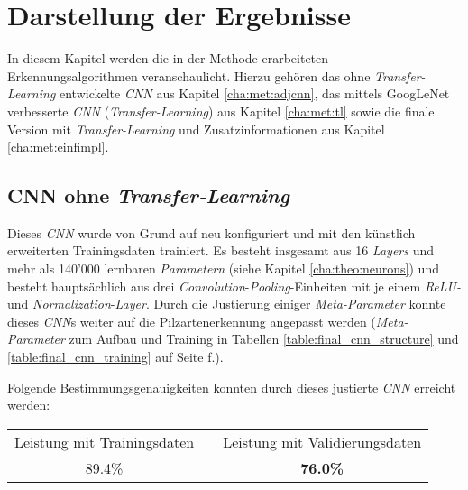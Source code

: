 \section{Darstellung der Ergebnisse}
In diesem Kapitel werden die in der Methode erarbeiteten Erkennungsalgorithmen veranschaulicht. Hierzu gehören das ohne \textit{Transfer-Learning} entwickelte \textit{CNN} aus Kapitel \ref{cha:met:adjcnn}, das mittels GoogLeNet verbesserte \textit{CNN} (\textit{Transfer-Learning}) aus Kapitel \ref{cha:met:tl} sowie die finale Version mit \textit{Transfer-Learning} und Zusatzinformationen aus Kapitel \ref{cha:met:einfimpl}.

\subsection{CNN ohne \textit{Transfer-Learning}}
Dieses \textit{CNN} wurde von Grund auf neu konfiguriert und mit den künstlich erweiterten Trainingsdaten trainiert. Es besteht insgesamt aus 16 \textit{Layers} und mehr als 140'000 lernbaren \textit{Parametern} (siehe Kapitel \ref{cha:theo:neurons}) und besteht hauptsächlich aus drei \textit{Convolution}-\textit{Pooling}-Einheiten mit je einem \textit{ReLU-} und \textit{Normalization}-\textit{Layer}. Durch die Justierung einiger \textit{Meta-Parameter} konnte dieses \textit{CNN}s weiter auf die Pilzartenerkennung angepasst werden (\textit{Meta-Parameter} zum Aufbau und Training in Tabellen \ref{table:final_cnn_structure} und \ref{table:final_cnn_training} auf Seite \pageref{table:final_cnn_structure} f.).

Folgende Bestimmungsgenauigkeiten konnten durch dieses justierte \textit{CNN} erreicht werden:

\begin{table}[h]
	\begin{center}
		\def\arraystretch{1.4}
		\begin{tabular}{ c c c }
			Leistung mit Trainingsdaten &\qquad\qquad\qquad& Leistung mit Validierungsdaten \\
			89.4\% && \textbf{76.0\%}\footnotemark \\
		\end{tabular}
	\end{center}
\end{table}


